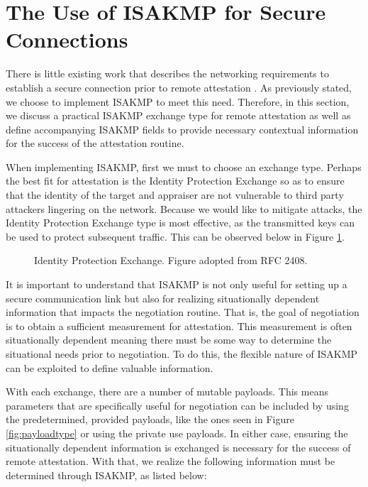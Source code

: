 \documentclass[12pt, letterpaper, twoside]{article}
\begin{document}
\section{The Use of ISAKMP for Secure Connections}

There is little existing work that describes the networking requirements to establish a secure connection prior to remote attestation \cite{ietf-reference-interaction-models-04}. As previously stated, we choose to implement ISAKMP to meet this need. Therefore, in this section, we discuss a practical ISAKMP exchange type for remote attestation as well as define accompanying ISAKMP fields to provide necessary contextual information for the success of the attestation routine. 


When implementing ISAKMP, first we must to choose an exchange type. Perhaps the best fit for attestation is the Identity Protection Exchange so as to ensure that the identity of the target and appraiser are not vulnerable to third party attackers lingering on the network. Because we would like to mitigate attacks, the Identity Protection Exchange type is most effective, as the transmitted keys can be used to protect subsequent traffic. This can be observed below in Figure \ref{fig:id_prot_fig}.  

\begin{figure}[hbtp]
\centering
\tcbox{
  
  }
  \caption[Base process]{Identity Protection Exchange. Figure adopted from RFC 2408\cite{ISAKMP}.}
  \label{fig:id_prot_fig}
\end{figure}

It is important to understand that ISAKMP is not only useful for setting up a secure communication link but also for realizing situationally dependent information that impacts the negotiation routine. That is, the goal of negotiation is to obtain a sufficient measurement for attestation. This measurement is often situationally dependent meaning there must be some way to determine the situational needs prior to negotiation. To do this, the flexible nature of ISAKMP can be exploited to define valuable information. 


With each exchange, there are a number of mutable payloads. This means parameters that are specifically useful for negotiation can be included by using the predetermined, provided payloads, like the ones seen in Figure \ref{fig:payloadtype} or using the private use payloads. In either case, ensuring the situationally dependent information is exchanged is necessary for the success of remote attestation. With that, we realize the following information must be determined through ISAKMP, as listed below: 
\end{document}
